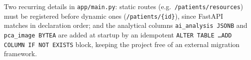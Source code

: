 Two recurring details in \texttt{app/main.py}: static routes (e.g.\ \texttt{/patients/resources}) must be registered before dynamic ones (\texttt{/patients/\{id\}}), since FastAPI matches in declaration order; and the analytical columns \texttt{ai\_analysis JSONB} and \texttt{pca\_image BYTEA} are added at startup by an idempotent \texttt{ALTER TABLE \ldots ADD COLUMN IF NOT EXISTS} block, keeping the project free of an external migration framework.
